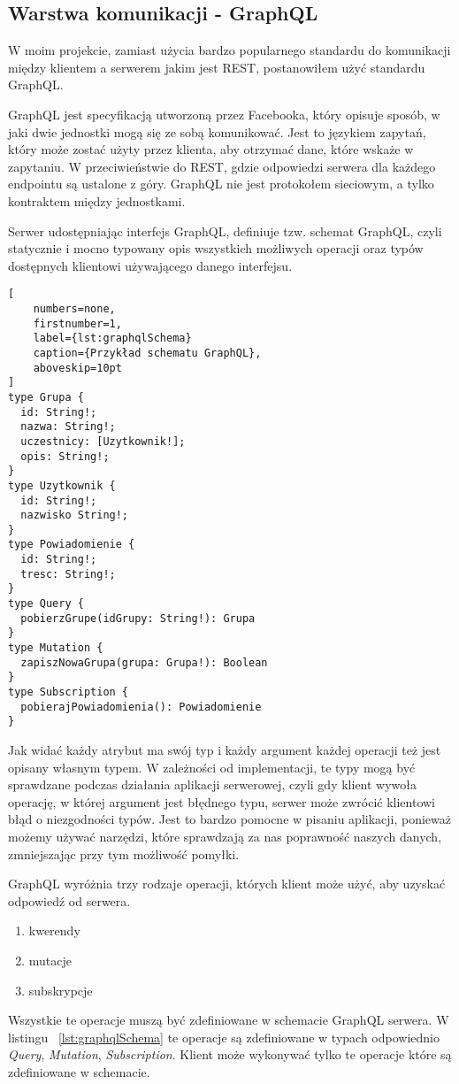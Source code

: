 \subsection{Warstwa komunikacji - GraphQL}
W moim projekcie, zamiast użycia bardzo popularnego standardu do komunikacji między klientem a serwerem jakim jest REST, postanowiłem użyć standardu GraphQL.

GraphQL jest specyfikacją utworzoną przez Facebooka, który opisuje sposób, w jaki dwie jednostki mogą się ze sobą komunikować. Jest to językiem zapytań, który może zostać użyty przez klienta, aby otrzymać dane, które wskaże w zapytaniu. W przeciwieństwie do REST, gdzie odpowiedzi serwera dla każdego endpointu są ustalone z góry. GraphQL nie jest protokołem sieciowym, a tylko kontraktem między jednostkami.

Serwer udostępniając interfejs GraphQL, definiuje tzw. schemat GraphQL, czyli statycznie i mocno typowany opis wszystkich możliwych operacji oraz typów dostępnych klientowi używającego danego interfejsu. 

\begin{addmargin}[6mm]{0mm}
\begin{lstlisting}[
    numbers=none,
    firstnumber=1,
    label={lst:graphqlSchema}
    caption={Przykład schematu GraphQL},
    aboveskip=10pt
]
type Grupa {
  id: String!;
  nazwa: String!;
  uczestnicy: [Uzytkownik!];
  opis: String!;
}
type Uzytkownik {
  id: String!;
  nazwisko String!;
}
type Powiadomienie {
  id: String!;
  tresc: String!;
}
type Query {
  pobierzGrupe(idGrupy: String!): Grupa
}
type Mutation {
  zapiszNowaGrupa(grupa: Grupa!): Boolean
}
type Subscription {
  pobierajPowiadomienia(): Powiadomienie
}
\end{lstlisting}
\end{addmargin}
Jak widać każdy atrybut ma swój typ i każdy argument każdej operacji też jest opisany własnym typem. W zależności od implementacji, te typy mogą być sprawdzane podczas działania aplikacji serwerowej, czyli gdy klient wywoła operację, w której argument jest błędnego typu, serwer może zwrócić klientowi błąd o niezgodności typów. Jest to bardzo pomocne w pisaniu aplikacji, ponieważ możemy używać narzędzi, które sprawdzają za nas poprawność naszych danych, zmniejszając przy tym możliwość pomyłki.

GraphQL wyróżnia trzy rodzaje operacji, których klient może użyć, aby uzyskać odpowiedź od serwera.
\begin{enumerate}
  \item kwerendy 
  \item mutacje
  \item subskrypcje
\end{enumerate}
Wszystkie te operacje muszą być zdefiniowane w schemacie GraphQL serwera. W listingu ~\ref{lst:graphqlSchema} te operacje są zdefiniowane w typach odpowiednio \emph{Query}, \emph{Mutation}, \emph{Subscription}. Klient może wykonywać tylko te operacje które są zdefiniowane w schemacie.

